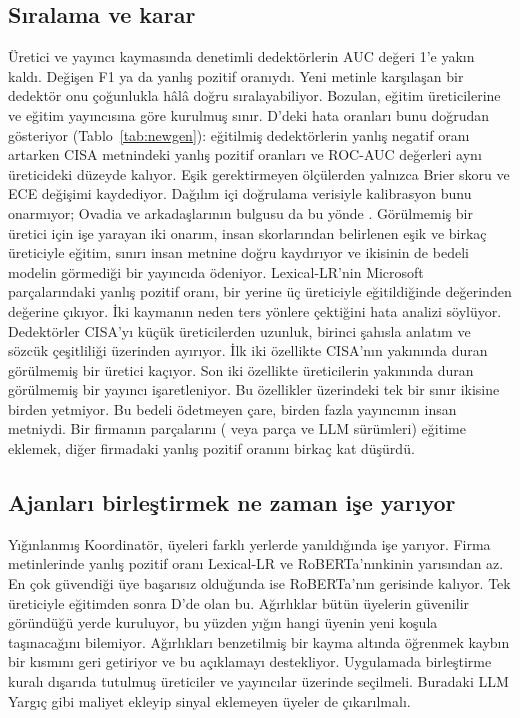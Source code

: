 \documentclass[journal]{IEEEtran}
\begin{document}
\subsection{Sıralama ve karar}
Üretici ve yayıncı kaymasında denetimli dedektörlerin AUC değeri 1'e yakın kaldı. Değişen F1 ya da yanlış pozitif
oranıydı. Yeni metinle karşılaşan bir dedektör onu çoğunlukla hâlâ doğru sıralayabiliyor. Bozulan, eğitim
üreticilerine ve eğitim yayıncısına göre kurulmuş sınır. D'deki hata oranları bunu doğrudan gösteriyor
(Tablo~\ref{tab:newgen}): eğitilmiş dedektörlerin yanlış negatif oranı artarken CISA metnindeki yanlış pozitif
oranları ve ROC-AUC değerleri aynı üreticideki düzeyde kalıyor. Eşik gerektirmeyen ölçülerden yalnızca Brier skoru
ve ECE değişimi kaydediyor. Dağılım içi doğrulama verisiyle kalibrasyon bunu
onarmıyor; Ovadia ve arkadaşlarının bulgusu da bu yönde \cite{Ovadia_2019}. Görülmemiş bir üretici için işe
yarayan iki onarım, insan skorlarından belirlenen eşik ve birkaç üreticiyle eğitim, sınırı insan metnine doğru
kaydırıyor ve ikisinin de bedeli modelin görmediği bir yayıncıda ödeniyor. Lexical-LR'nin Microsoft
parçalarındaki yanlış pozitif oranı, bir yerine üç üreticiyle eğitildiğinde \PoolfprOneMicrosoftLexlr{} değerinden
\PoolfprThreeMicrosoftLexlr{} değerine çıkıyor. İki kaymanın neden ters yönlere çektiğini hata analizi söylüyor.
Dedektörler CISA'yı küçük üreticilerden uzunluk, birinci şahısla anlatım ve sözcük çeşitliliği üzerinden ayırıyor.
İlk iki özellikte CISA'nın yakınında duran görülmemiş bir üretici kaçıyor. Son iki özellikte üreticilerin yakınında
duran görülmemiş bir yayıncı işaretleniyor. Bu özellikler üzerindeki tek bir sınır ikisine birden yetmiyor. Bu
bedeli ödetmeyen çare, birden fazla yayıncının insan metniydi. Bir firmanın parçalarını (\NExtChunksMicrosoft{}
veya \NExtChunksMandiant{} parça ve LLM sürümleri) eğitime eklemek, diğer firmadaki yanlış pozitif oranını birkaç
kat düşürdü.

\subsection{Ajanları birleştirmek ne zaman işe yarıyor}
Yığınlanmış Koordinatör, üyeleri farklı yerlerde yanıldığında işe yarıyor. Firma metinlerinde yanlış pozitif oranı
Lexical-LR ve RoBERTa'nınkinin yarısından az. En çok güvendiği üye başarısız olduğunda ise RoBERTa'nın gerisinde
kalıyor. Tek üreticiyle eğitimden sonra D'de olan bu. Ağırlıklar bütün üyelerin güvenilir göründüğü yerde
kuruluyor, bu yüzden yığın hangi üyenin yeni koşula taşınacağını bilemiyor. Ağırlıkları benzetilmiş bir kayma
altında öğrenmek kaybın bir kısmını geri getiriyor ve bu açıklamayı destekliyor. Uygulamada birleştirme kuralı
dışarıda tutulmuş üreticiler ve yayıncılar üzerinde seçilmeli. Buradaki LLM Yargıç gibi maliyet ekleyip sinyal
eklemeyen üyeler de çıkarılmalı.
\end{document}

